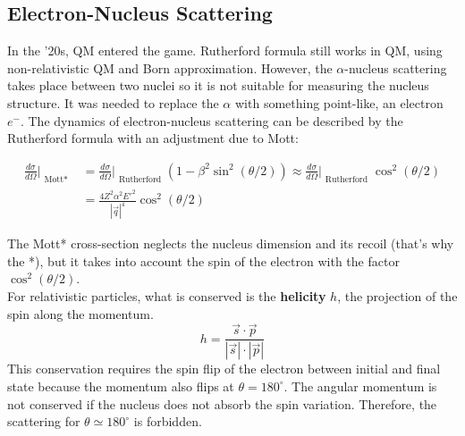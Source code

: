 \documentclass[10.75pt,a4paper,openright,bottom=2cm]{article}
\newcommand{\beginbox}[1]{\begin{tcolorbox}[width=\textwidth,colback={yellow!50},title={#1},colbacktitle={gray!50},coltitle=black]}
\renewcommand{\endbox}{\end{tcolorbox}\noindent}
\begin{document}
\subsection{Electron-Nucleus Scattering}
In the '20s, QM entered the game. Rutherford formula still works in QM, using non-relativistic QM and Born approximation. However, the $\alpha$-nucleus scattering takes place between two nuclei so it is not suitable for measuring the nucleus structure. It was needed to replace the $\alpha$ with something point-like, an electron $e^-$. The dynamics of electron-nucleus scattering can be described by the Rutherford formula with an adjustment due to Mott:
\beginbox{Mott Cross Section}
\begin{align*}
\frac{d\sigma}{d\Omega}\Bigr|_{\substack{\text{Mott*}}}&=\frac{d\sigma}{d\Omega}\Bigr|_{\substack{\text{Rutherford}}}\left(1-\beta^2\sin^2(\theta/2)\right)\approx\frac{d\sigma}{d\Omega}\Bigr|_{\substack{\text{Rutherford}}}\cos^2(\theta/2)\\
&=\frac{4Z^2\alpha^2E'^2}{|\Vec{q}|^4}\cos^2(\theta/2)
\end{align*}
\endbox
The Mott* cross-section neglects the nucleus dimension and its recoil (that's why the *), but it takes into account the spin of the electron with the factor $\cos^2(\theta/2)$.\\
For relativistic particles, what is conserved is the \textbf{helicity} $h$, the projection of the spin along the momentum. 
\[
h=\frac{\Vec{s}\cdot\Vec{p}}{|\Vec{s}|\cdot|\Vec{p}|}
\]
This conservation requires the spin flip of the electron between initial and final state because the momentum also flips at $\theta=180^\circ$. The angular momentum is not conserved if the nucleus does not absorb the spin variation. Therefore, the scattering for $\theta\simeq180^\circ$ is forbidden.
\end{document}
